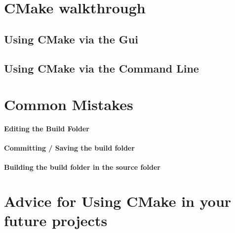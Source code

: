 \documentclass[11pt, a4paper]{article}
\newcommand{\figuremacro}[5]{
    \begin{figure}[#1]
        \centering
        \texttt{[image: \#2]}
        \caption[#3]{\textbf{#3}#4}
        \label{fig:#2}
    \end{figure}
}
\begin{document}
       \clearpage
    \section{CMake walkthrough}
       \subsection{Using CMake via the Gui}
   \subsection{Using CMake via the Command Line}
   \clearpage
    \section{Common Mistakes}
    \paragraph{Editing the Build Folder}
   
    \paragraph{Committing / Saving the build folder}
    
    \paragraph{Building the build folder in the source folder}
    
    \section{Advice for Using CMake in your future projects}
    
\end{document}
